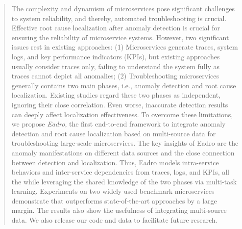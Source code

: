\begin{abstract}
The complexity and dynamism of microservices pose significant challenges to system reliability, and thereby, automated troubleshooting is crucial.
Effective root cause localization after anomaly detection is crucial for ensuring the reliability of microservice systems.
However, two significant issues rest in existing approaches: 
(1) Microservices generate traces, system logs, and key performance indicators (KPIs), but existing approaches usually consider traces only, failing to understand the system fully as traces cannot depict all anomalies; 
(2) Troubleshooting microservices generally contains two main phases, i.e., anomaly detection and root cause localization. 
Existing studies regard these two phases as independent, ignoring their close correlation. Even worse, inaccurate detection results can deeply affect localization effectiveness.
To overcome these limitations, we propose \textit{Eadro}, the first end-to-end framework to integrate anomaly detection and root cause localization based on multi-source data for troubleshooting large-scale microservices.
The key insights of Eadro are the anomaly manifestations on different data sources and the close connection between detection and localization.
Thus, Eadro models intra-service behaviors and inter-service dependencies from traces, logs, and KPIs, all the while leveraging the shared knowledge of the two phases via multi-task learning.
Experiments on two widely-used benchmark microservices demonstrate that \name outperforms state-of-the-art approaches by a large margin. The results also show the usefulness of integrating multi-source data.
We also release our code and data to facilitate future research.
\end{abstract}

